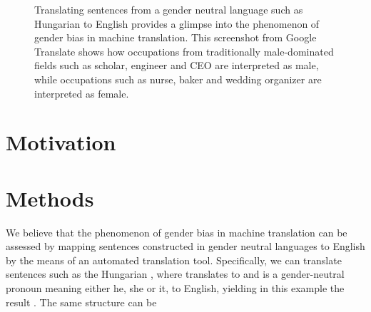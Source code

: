 \documentclass{article}
\begin{document}
\begin{figure}[h]
	\centering
	\label{fig:screenshot-gtranslate-hungarian}
	\caption{Translating sentences from a gender neutral language such as Hungarian to English provides a glimpse into the phenomenon of gender bias in machine translation. This screenshot from Google Translate shows how occupations from traditionally male-dominated fields such as scholar, engineer and CEO are interpreted as male, while occupations such as nurse, baker and wedding organizer are interpreted as female.}
\end{figure}

\section{Motivation}

\section{Methods}

We believe that the phenomenon of gender bias in machine translation can be assessed by mapping sentences constructed in gender neutral languages to English by the means of an automated translation tool. Specifically, we can translate sentences such as the Hungarian , where  translates to  and  is a gender-neutral pronoun meaning either he, she or it, to English, yielding in this example the result . The same structure can be 
\end{document}
